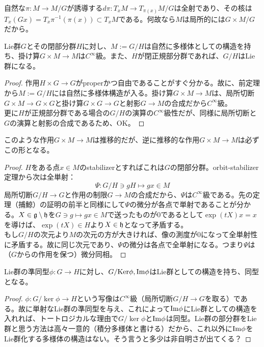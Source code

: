 自然な$\pi:M\to M/G$が誘導する$d\pi:T_x M\to T_{\pi(x)}M/G$は全射であり、その核は$T_x(Gx)=T_x\pi^{-1}(\pi(x))\subset T_x M$である。何故なら$M$は局所的には$G\times M/G$だから。
\begin{cor}
    Lie群$G$とその閉部分群$H$に対し、$M:=G/H$は自然に多様体としての構造を持ち、掛け算$G\times M\to M$は$C^\infty$級。また、$H$が閉正規部分群であれば、$G/H$はLie群になる。
\end{cor}
\begin{proof}
    作用$H\times G\to G$がproperかつ自由であることがすぐ分かる。故に、前定理から$M:=G/H$には自然に多様体構造が入る。掛け算$G\times M\to M$は、局所切断$G\times M\to G\times G$と掛け算$G\times G\to G$と射影$G\to M$の合成だから$C^\infty$級。\\
    更に$H$が正規部分群である場合の$G/H$の演算の$C^\infty$級性だが、同様に局所切断と$G$の演算と射影の合成であるため、OK。
\end{proof}
\begin{prop}[等質空間]
    このような作用$G\times M\to M$は推移的だが、逆に推移的な作用$G\times M\to M$は必ずこの形となる。
\end{prop}
\begin{proof}
    $H$をある点$x\in M$のstabilizerとすればこれは$G$の閉部分群。orbit-stabilizer定理から次は全単射：
    \[\Psi:G/H\ni gH\longmapsto gx\in M\]
    局所切断$G/H\to G$と作用の制限$G\to M$の合成だから、$\Psi$は$C^\infty$級である。先の定理（捕鯨）の証明の前半と同様にして$\Psi$の微分が各点で単射であることが分かる。$X\in\mathfrak{g}\setminus\mathfrak{h}$を$G\ni g\mapsto gx\in M$で送ったものが0であるとして$\exp(tX)x=x$を導けば、$\exp(tX)\in H$より$X\in\mathfrak{h}$となって矛盾する。\\
    もし$G/H$の次元より$M$の次元の方が大きければ、像の測度が0になって全単射性に矛盾する。故に同じ次元であり、$\Psi$の微分は各点で全単射になる。つまり$\Psi$は（$G$からの作用を保つ）微分同相。
\end{proof}
\begin{prop}[準同型定理]
    Lie群の準同型$\phi:G\to H$に対し、$G/\mathrm{Ker}\phi,\mathrm{Im}\phi$はLie群としての構造を持ち、同型となる。
\end{prop}
\begin{proof}
    $\phi:G/\ker\phi\to H$という写像は$C^\infty$級（局所切断$G/H\to G$を取る）である。故に単射なLie群の準同型を与え、これによって$\mathrm{Im}\phi$にLie群としての構造を入れれば、トートロジカルな理由で$G/\ker\phi$と$\mathrm{Im}\phi$は同型。Lie群の部分群をLie群と思う方法は高々一意的（積分多様体と書ける）だから、これ以外に$\mathrm{Im}\phi$をLie群化する多様体の構造はない。そう言うと多少は非自明さが出てくる？
\end{proof}
